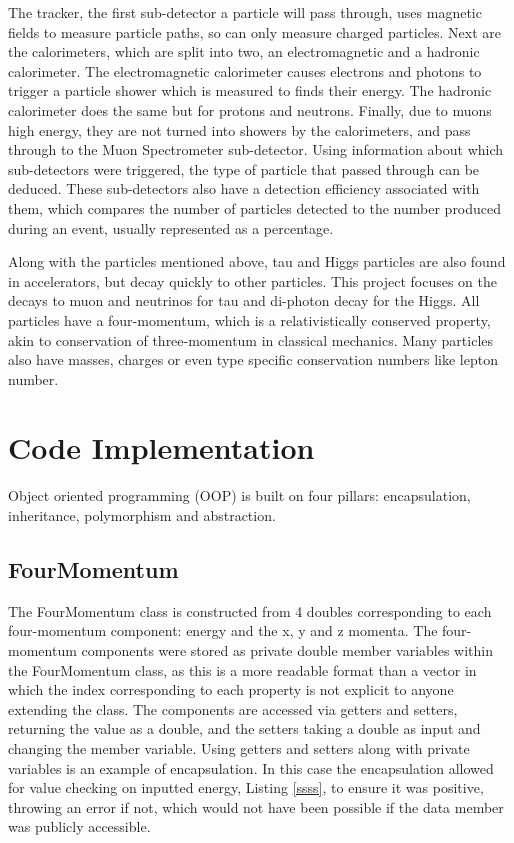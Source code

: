 \documentclass[11pt]{article} %
\begin{document}
The tracker, the first sub-detector a particle will pass through, uses magnetic fields to measure particle paths, so can only measure charged particles. Next are the calorimeters, which are split into two, an electromagnetic and a hadronic calorimeter. The electromagnetic calorimeter causes electrons and photons to trigger a particle shower which is measured to finds their energy. The hadronic calorimeter does the same but for protons and neutrons. Finally, due to muons high energy, they are not turned into showers by the calorimeters, and pass through to the Muon Spectrometer sub-detector. Using information about which sub-detectors were triggered, the type of particle that passed through can be deduced. These sub-detectors also have a detection efficiency associated with them, which compares the number of particles detected to the number produced during an event, usually represented as a percentage. 

Along with the particles mentioned above, tau and Higgs particles are also found in accelerators, but decay quickly to other particles. This project focuses on the decays to muon and neutrinos for tau and di-photon decay for the Higgs. All particles have a four-momentum, which is a relativistically conserved property, akin to conservation of three-momentum in classical mechanics. Many particles also have masses, charges or even type specific conservation numbers like lepton number. 
 
\section{Code Implementation}
Object oriented programming (OOP) is built on four pillars: encapsulation, inheritance, polymorphism and abstraction.
\subsection{FourMomentum} 
\label{Foir}
The FourMomentum class is constructed from 4 doubles corresponding to each four-momentum component: energy and the x, y and z momenta.
The four-momentum components were stored as private double member variables within the FourMomentum class, as this is a more readable format than a vector in which the index corresponding to each property is not explicit to anyone extending the class.
The components are accessed via getters and setters, returning the value as a double, and the setters taking a double as input and changing the member variable. Using getters and setters along with private variables is an example of encapsulation. In this case the encapsulation allowed for value checking on inputted energy, Listing \ref{ssss}, to ensure it was positive, throwing an error if not, which would not have been possible if the data member was publicly accessible.
\end{document}
